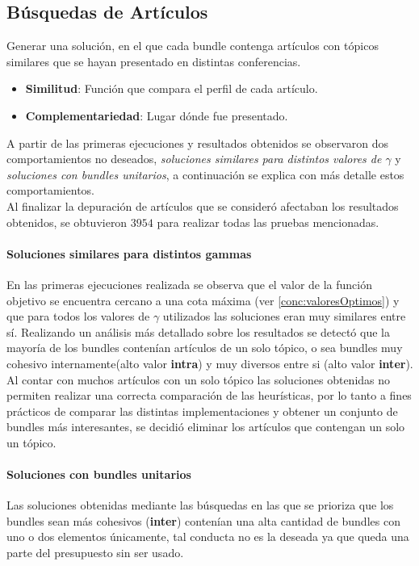 \subsection{Búsquedas de Artículos}\label{res:busPaper}
Generar una solución, en el que cada bundle contenga artículos con tópicos similares que se hayan presentado en distintas conferencias.\\
\begin{itemize}
  \item \textbf{Similitud}: Función que compara el perfil de cada artículo.
  \item \textbf{Complementariedad}: Lugar dónde fue presentado.
\end{itemize}

A partir de las primeras ejecuciones y resultados obtenidos se observaron dos comportamientos no deseados, \textit{soluciones similares para distintos valores de $\gamma$} y \textit{soluciones con bundles unitarios}, a continuación se explica con más detalle estos comportamientos.\\

Al finalizar la depuración de artículos que se consideró afectaban los resultados obtenidos, se obtuvieron $3954$ para realizar todas las pruebas mencionadas.
\paragraph{Soluciones similares para distintos gammas}
En las primeras ejecuciones realizada se observa que el valor de la función objetivo se encuentra cercano a una cota máxima (ver \ref{conc:valoresOptimos}) y que para todos los valores de $\gamma$ utilizados las soluciones eran muy similares entre sí. Realizando un análisis más detallado sobre los resultados se detectó que la mayoría de los bundles contenían artículos de un solo tópico, o sea bundles  muy cohesivo internamente(alto valor \textbf{intra}) y muy diversos entre si (alto valor \textbf{inter}).\\

Al contar con muchos artículos con un solo tópico las soluciones obtenidas no permiten realizar una correcta comparación de las heurísticas, por lo tanto a fines prácticos de comparar las distintas implementaciones y obtener un conjunto de bundles más interesantes, se decidió eliminar los artículos que contengan un solo un tópico.
\paragraph{Soluciones con bundles unitarios}
Las soluciones obtenidas mediante las búsquedas en las que se prioriza que los bundles sean más cohesivos (\textbf{inter}) contenían una alta cantidad de bundles con uno o dos elementos únicamente, tal conducta no es la deseada ya que queda una parte del presupuesto sin ser usado.\\


